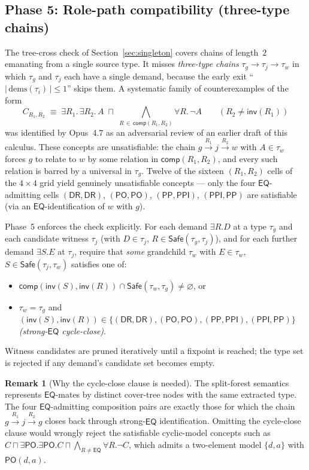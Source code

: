 \documentclass[a4paper,11pt]{article}
\theoremstyle{definition}
\newtheorem{remark}[theorem]{Remark}
\newcommand{\DR}{\ensuremath{\mathsf{DR}}}
\newcommand{\PO}{\ensuremath{\mathsf{PO}}}
\newcommand{\EQ}{\ensuremath{\mathsf{EQ}}}
\newcommand{\PP}{\ensuremath{\mathsf{PP}}}
\newcommand{\PPI}{\ensuremath{\mathsf{PPI}}}
\newcommand{\inv}{\ensuremath{\mathsf{inv}}}
\newcommand{\comp}{\ensuremath{\mathsf{comp}}}
\newcommand{\Safe}{\ensuremath{\mathsf{Safe}}}
\begin{document}
\subsection{Phase 5: Role-path compatibility (three-type chains)}
\label{sec:rolepath}

The tree-cross check of Section~\ref{sec:singleton} covers chains of
length~$2$ emanating from a single source type. It misses
\emph{three-type chains} $\tau_g \to \tau_j \to \tau_w$ in which
$\tau_g$ and $\tau_j$ each have a single demand, because the early
exit ``$|\,\text{dems}(\tau_i)\,| \le 1$'' skips them. A
systematic family of counterexamples of the form
\[
  C_{R_1, R_2} \;\equiv\;
  \exists R_1.\,\exists R_2.\,A
  \;\sqcap\;
  \bigwedge_{R \,\in\, \comp(R_1, R_2)} \forall R.\,\neg A
  \qquad (R_2 \ne \inv(R_1))
\]
was identified by Opus~4.7 as an adversarial review of an earlier
draft of this calculus. These concepts are unsatisfiable: the chain
$g \xrightarrow{R_1} j \xrightarrow{R_2} w$ with $A \in \tau_w$
forces $g$ to relate to $w$ by some relation in $\comp(R_1, R_2)$, and
every such relation is barred by a universal in $\tau_g$.
Twelve of the sixteen $(R_1, R_2)$ cells of the $4 \times 4$ grid
yield genuinely unsatisfiable concepts --- only the four
$\EQ$-admitting cells $(\DR,\DR)$, $(\PO,\PO)$, $(\PP,\PPI)$,
$(\PPI,\PP)$ are satisfiable (via an $\EQ$-identification of $w$ with
$g$).

Phase~5 enforces the check explicitly. For each demand
$\exists R.D$ at a type $\tau_g$ and each candidate witness
$\tau_j$ (with $D \in \tau_j$, $R \in \Safe(\tau_g, \tau_j)$), and
for each further demand $\exists S.E$ at $\tau_j$, require that
\emph{some} grandchild $\tau_w$ with $E \in \tau_w$,
$S \in \Safe(\tau_j, \tau_w)$ satisfies one of:
\begin{itemize}[nosep]
  \item $\comp(\inv(S), \inv(R)) \cap \Safe(\tau_w, \tau_g)
    \neq \varnothing$, or
  \item $\tau_w = \tau_g$ and
    $(\inv(S), \inv(R)) \in \{(\DR,\DR), (\PO,\PO),
    (\PP,\PPI), (\PPI,\PP)\}$ \emph{(strong-$\EQ$ cycle-close)}.
\end{itemize}
Witness candidates are pruned iteratively until a fixpoint is
reached; the type set is rejected if any demand's candidate set
becomes empty.

\begin{remark}[Why the cycle-close clause is needed]
\label{rem:cycleclose}
The split-forest semantics represents $\EQ$-mates by distinct cover-tree
nodes with the same extracted type. The four $\EQ$-admitting
composition pairs are exactly those for which the chain
$g \xrightarrow{R_1} j \xrightarrow{R_2} g$ closes back through
strong-$\EQ$ identification. Omitting the cycle-close clause
would wrongly reject the satisfiable cyclic-model concepts
such as $C \sqcap \exists\PO.\exists\PO.C \sqcap
\bigwedge_{R \ne \EQ} \forall R.\neg C$, which admits a
two-element model $\{d, a\}$ with $\PO(d, a)$.
\end{remark}
\end{document}
